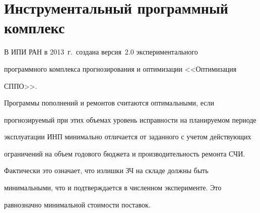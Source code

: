 \section{Инструментальный программный комплекс}



     В ИПИ РАН в 2013~г.\ создана версия~2.0 экспериментального

программного комплекса прогнозирования и оптимизации <<Оптимизация

СППО>>.



     Программы пополнений и ремонтов считаются оптимальными, если

прогнозируемый при этих объемах уровень исправности на планируемом периоде

эксплуатации ИНП минимально отличается от заданного с учетом дейст\-ву\-ющих

ограничений на объем годового бюджета и производительность ремонта СЧИ.\linebreak\vspace*{-12pt}






\noindent

Фактически это означает, что излишки ЗЧ на складе должны быть

минимальными, что и подтверждается в численном эксперименте. Это

равнозначно минимальной стоимости поставок.







